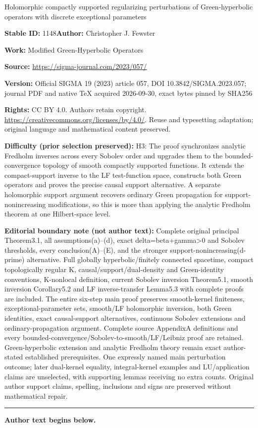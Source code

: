 \documentclass[11pt]{article}
\numberwithin{equation}{section}
\numberwithin{equation}{section}
\begin{document}
\begin{center}\Large Holomorphic compactly supported regularizing perturbations of Green-hyperbolic operators with discrete exceptional parameters\end{center}
\noindent\textbf{Stable ID:} 1148\quad\textbf{Author:} Christopher J. Fewster\par
\noindent\textbf{Work:} Modified Green-Hyperbolic Operators\par
\noindent\textbf{Source:} \url{https://sigma-journal.com/2023/057/}\par
\noindent\textbf{Version:} Official SIGMA 19 (2023) article 057, DOI 10.3842/SIGMA.2023.057; journal PDF and native TeX acquired 2026-09-30, exact bytes pinned by SHA256\par
\noindent\textbf{Rights:} CC BY 4.0. Authors retain copyright. \url{https://creativecommons.org/licenses/by/4.0/}. Reuse and typesetting adaptation; original language and mathematical content preserved.\par
\noindent\textbf{Difficulty (prior selection preserved):} {\CJKfont H3: The proof synchronizes analytic Fredholm inverses across every Sobolev order and upgrades them to the bounded-convergence topology of smooth compactly supported functions. It extends the compact-support inverse to the LF test-function space, constructs both Green operators and proves the precise causal support alternative. A separate holomorphic support argument recovers ordinary Green propagation for support-nonincreasing modifications, so this is more than applying the analytic Fredholm theorem at one Hilbert-space level.}\par
\medskip\noindent\textbf{Editorial boundary note (not author text):} Complete original principal Theorem3.1, all assumptions(a)–(d), exact delta=beta+gamma>0 and Sobolev thresholds, every conclusion(A)–(E), and the stronger support-nonincreasing(d-prime) alternative. Full globally hyperbolic/finitely connected spacetime, compact topologically regular K, causal/support/dual-density and Green-identity conventions, K-nonlocal definition, current Sobolev inversion Theorem5.1, smooth inversion Corollary5.2 and LF inverse-transfer Lemma5.3 with complete proofs are included. The entire six-step main proof preserves smooth-kernel finiteness, exceptional-parameter sets, smooth/LF holomorphic inversion, both Green identities, exact causal-support alternatives, continuous Sobolev extensions and ordinary-propagation argument. Complete source AppendixA definitions and every bounded-convergence/Sobolev-to-smooth/LF/Leibniz proof are retained. Green-hyperbolic extension and analytic Fredholm theory remain exact author-stated established prerequisites. One expressly named main perturbation outcome; later dual-kernel equality, integral-kernel examples and LU/application claims are unselected, with supporting lemmas receiving no extra counts. Original author support claims, spelling, inclusions and signs are preserved without mathematical repair.\par
\medskip\hrule\medskip\noindent\textbf{Author text begins below.}\par
\setcounter{section}{1}
\end{document}
